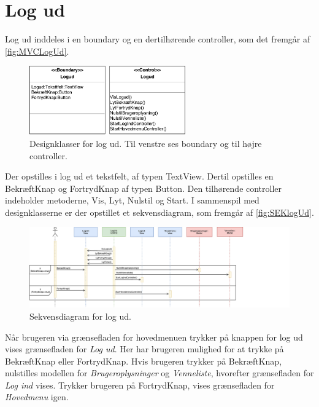 \section*{Log ud}
Log ud inddeles i en boundary og en dertilhørende controller, som det fremgår af \autoref{fig:MVCLogUd}. 

\begin{figure} [H]
\centering
\includegraphics[width=0.6\textwidth]{figures/MVC/Logud}
\caption{Designklasser for log ud. Til venstre ses boundary og til højre controller.}
\label{fig:MVCLogUd}
\end{figure}

\noindent
Der opstilles i log ud et tekstfelt, af typen TextView. Dertil opstilles en BekræftKnap og FortrydKnap af typen Button. 
Den tilhørende controller indeholder metoderne, Vis, Lyt, Nulstil og Start. I sammenspil med designklasserne er der opstillet et sekvensdiagram, som fremgår af \autoref{fig:SEKlogUd}.

\begin{figure} [H]
\centering
\includegraphics[width=1.28\textwidth]{figures/Sek/SEKLogUd}
\caption{Sekvensdiagram for log ud.}
\label{fig:SEKlogUd}
\end{figure}

\noindent
Når brugeren via grænsefladen for hovedmenuen trykker på knappen for log ud vises grænsefladen for \textit{Log ud}. Her har brugeren mulighed for at trykke på BekræftKnap eller FortrydKnap. Hvis brugeren trykker på BekræftKnap, nulstilles modellen for \textit{Brugeroplysninger} og \textit{Venneliste}, hvorefter grænsefladen for \textit{Log ind} vises. Trykker brugeren på FortrydKnap, vises grænsefladen for \textit{Hovedmenu} igen. 
